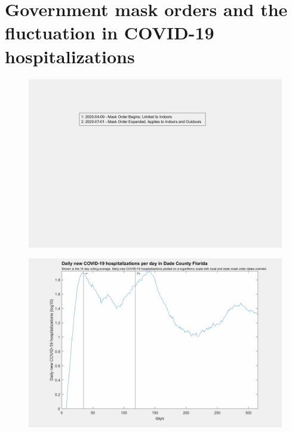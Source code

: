 \documentclass[]{article}
\begin{document}
\FloatBarrier

\vspace{5mm}
\section*{Government mask orders and the fluctuation in COVID-19 hospitalizations }


\begin{figure}[!h]
	\includegraphics[width=\linewidth]{legends/dade_mask_order_legend.png}
	\caption{}
	\label{fig:legends/dade_mask_order_legendLabel}
\end{figure}

\begin{figure}[!h]
	\includegraphics[width=\linewidth]{images/dade_mask_order_hospitalizations_log.png}
	\caption{}
	\label{fig:images/dade_mask_order_hospitalizations_logLabel}
\end{figure}
\end{document}

